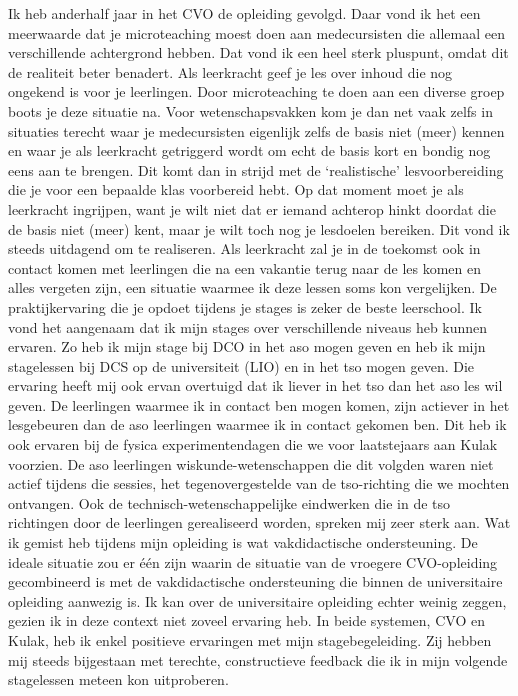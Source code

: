 \documentclass[a4paper,12pt,twoside]{article}%
\begin{document}
Ik heb anderhalf jaar in het CVO de opleiding gevolgd. Daar vond ik het een meerwaarde dat je microteaching moest doen aan medecursisten die allemaal een verschillende achtergrond hebben. Dat vond ik een heel sterk pluspunt, omdat dit de realiteit beter benadert. Als leerkracht geef je les over inhoud die nog ongekend is voor je leerlingen. Door microteaching te doen aan een diverse groep boots je deze situatie na. Voor wetenschapsvakken kom je dan net vaak zelfs in situaties terecht waar je medecursisten eigenlijk zelfs de basis niet (meer) kennen en waar je als leerkracht getriggerd wordt om echt de basis kort en bondig nog eens aan te brengen. Dit komt dan in strijd met de `realistische' lesvoorbereiding die je voor een bepaalde klas voorbereid hebt. Op dat moment moet je als leerkracht ingrijpen, want je wilt niet dat er iemand achterop hinkt doordat die de basis niet (meer) kent, maar je wilt toch nog je lesdoelen bereiken. Dit vond ik steeds uitdagend om te realiseren. Als leerkracht zal je in de toekomst ook in contact komen met leerlingen die na een vakantie terug naar de les komen en alles vergeten zijn, een situatie waarmee ik deze lessen soms kon vergelijken. \newline
De praktijkervaring die je opdoet tijdens je stages is zeker de beste leerschool. Ik vond het aangenaam dat ik mijn stages over verschillende niveaus heb kunnen ervaren. Zo heb ik mijn stage bij DCO in het aso mogen geven en heb ik mijn stagelessen bij DCS op de universiteit (LIO) en in het tso mogen geven. Die ervaring heeft mij ook ervan overtuigd dat ik liever in het tso dan het aso les wil geven. De leerlingen waarmee ik in contact ben mogen komen, zijn actiever in het lesgebeuren dan de aso leerlingen waarmee ik in contact gekomen ben. Dit heb ik ook ervaren bij de fysica experimentendagen die we voor laatstejaars aan Kulak voorzien. De aso leerlingen wiskunde-wetenschappen die dit volgden waren niet actief tijdens die sessies, het tegenovergestelde van de tso-richting die we mochten ontvangen. Ook de technisch-wetenschappelijke eindwerken die in de tso richtingen door de leerlingen gerealiseerd worden, spreken mij zeer sterk aan. \newline
Wat ik gemist heb tijdens mijn opleiding is wat vakdidactische ondersteuning. De ideale situatie zou er één zijn waarin de situatie van de vroegere CVO-opleiding gecombineerd is met de vakdidactische ondersteuning die binnen de universitaire opleiding aanwezig is. Ik kan over de universitaire opleiding echter weinig zeggen, gezien ik in deze context niet zoveel ervaring heb. \newline 
In beide systemen, CVO en Kulak, heb ik enkel positieve ervaringen met mijn stagebegeleiding. Zij hebben mij steeds bijgestaan met terechte, constructieve feedback die ik in mijn volgende stagelessen meteen kon uitproberen.




	
	
	
\end{document}
